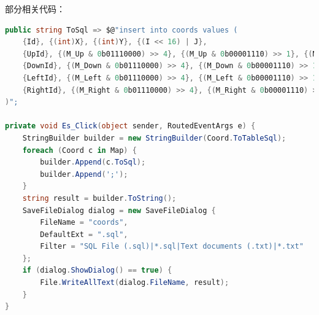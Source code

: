 部分相关代码：

\begin{lstlisting}[language=cs]
public string ToSql => $@"insert into coords values (
    {Id}, {(int)X}, {(int)Y}, {(I << 16) | J},
    {UpId}, {(M_Up & 0b01110000) >> 4}, {(M_Up & 0b00001110) >> 1}, {(M_Up & 0b00000001)},
    {DownId}, {(M_Down & 0b01110000) >> 4}, {(M_Down & 0b00001110) >> 1}, {(M_Down & 0b00000001)},
    {LeftId}, {(M_Left & 0b01110000) >> 4}, {(M_Left & 0b00001110) >> 1}, {(M_Left & 0b00000001)},
    {RightId}, {(M_Right & 0b01110000) >> 4}, {(M_Right & 0b00001110) >> 1}, {(M_Right & 0b00000001)}
)";

private void Es_Click(object sender, RoutedEventArgs e) {
    StringBuilder builder = new StringBuilder(Coord.ToTableSql);
    foreach (Coord c in Map) {
        builder.Append(c.ToSql);
        builder.Append(';');
    }
    string result = builder.ToString();
    SaveFileDialog dialog = new SaveFileDialog {
        FileName = "coords",
        DefaultExt = ".sql",
        Filter = "SQL File (.sql)|*.sql|Text documents (.txt)|*.txt"
    };
    if (dialog.ShowDialog() == true) {
        File.WriteAllText(dialog.FileName, result);
    }
}
\end{lstlisting}
